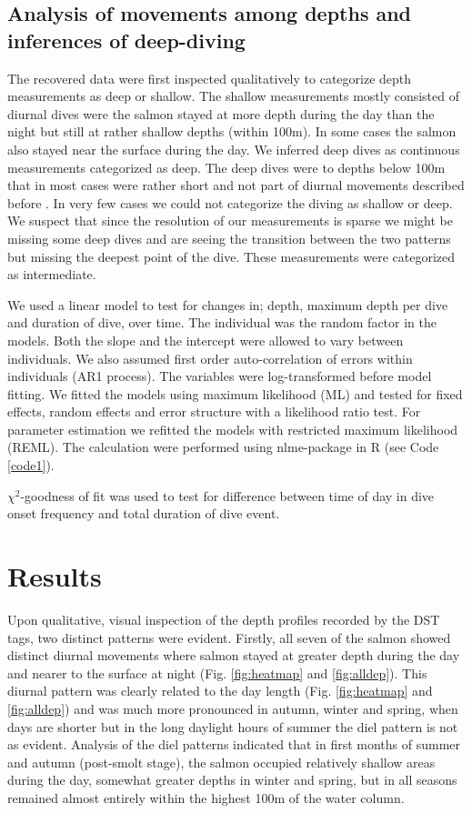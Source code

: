 \subsection{Analysis of movements among depths and inferences of deep-diving}
The recovered data were first inspected qualitatively to categorize depth measurements as deep or shallow.  The shallow measurements mostly consisted of diurnal dives were the salmon stayed at more depth during the day than the night but still at rather shallow depths (within 100m). In some cases the salmon also stayed near the surface during the day. We inferred deep dives as continuous measurements categorized as deep. The deep dives were to depths below 100m that in most cases were rather short and not part of diurnal movements described before \citep{Gudjonsson2015}. In very few cases we could not categorize the diving as shallow or deep. We suspect that since the resolution of our measurements is sparse we might be missing some deep dives and are seeing the transition between the two patterns but missing the deepest point of the dive. These measurements were categorized as intermediate. 

We used a linear model to test for changes in; depth, maximum depth per dive and duration of dive, over time. The individual was the random factor in the models. Both the slope and the intercept were allowed to vary between individuals. We also assumed first order auto-correlation of errors within individuals (AR1 process). The variables were log-transformed before model fitting. We fitted the models using maximum likelihood (ML) and tested for fixed effects, random effects and error structure with a likelihood ratio test. For parameter estimation we refitted the models with restricted maximum likelihood (REML). The calculation were performed using nlme-package \citep{Pinheiro2009} in R (see Code \ref{code1}).

$\chi^2$-goodness of fit was used to test for difference between time of day in dive onset frequency and total duration of dive event. 

\section{Results}
\label{Res}
Upon qualitative, visual inspection of the depth profiles recorded by the DST tags, two distinct patterns were evident. 
Firstly, all seven of the salmon showed distinct diurnal movements where salmon stayed at greater depth during the day and nearer to the surface at night (Fig. \ref{fig:heatmap} and \ref{fig:alldep}). 
This diurnal pattern was clearly related to the day length (Fig. \ref{fig:heatmap} and \ref{fig:alldep}) and was much more pronounced in autumn, winter and spring, when days are shorter but in the long daylight hours of summer the diel pattern is not as evident. Analysis of the diel patterns indicated that in first months of summer and autumn (post-smolt stage), the salmon occupied relatively shallow areas during the day, somewhat greater depths in winter and spring, but in all seasons remained almost entirely within the highest 100m of the water column.

